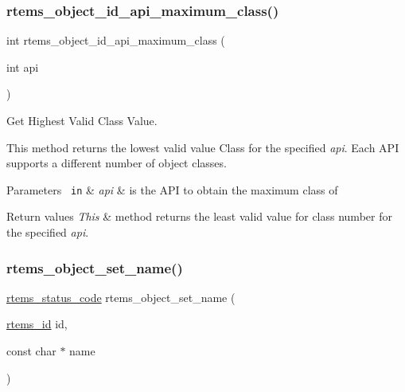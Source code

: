 \subsubsection{\texorpdfstring{rtems\_object\_id\_api\_maximum\_class()}{rtems\_object\_id\_api\_maximum\_class()}}
{\footnotesize\ttfamily int rtems\+\_\+object\+\_\+id\+\_\+api\+\_\+maximum\+\_\+class (\begin{DoxyParamCaption}\item[{int}]{api }\end{DoxyParamCaption})}



Get Highest Valid Class Value. 

This method returns the lowest valid value Class for the specified {\itshape api}. Each A\+PI supports a different number of object classes.


\begin{DoxyParams}[1]{Parameters}
\mbox{\texttt{ in}}  & {\em api} & is the A\+PI to obtain the maximum class of\\
\hline
\end{DoxyParams}

\begin{DoxyRetVals}{Return values}
{\em This} & method returns the least valid value for class number for the specified {\itshape api}. \\
\hline
\end{DoxyRetVals}
\mbox{\label{group__ClassicClassInfo_gacb1a1933caf2556aa7e9b715c684fe5b}} 
\subsubsection{\texorpdfstring{rtems\_object\_set\_name()}{rtems\_object\_set\_name()}}
{\footnotesize\ttfamily \mbox{\hyperlink{group__ClassicStatus_ga545d41846817eaba6143d52ee4d9e9fe}{rtems\+\_\+status\+\_\+code}} rtems\+\_\+object\+\_\+set\+\_\+name (\begin{DoxyParamCaption}\item[{\mbox{\hyperlink{group__ClassicTasks_gab20892b814dced7dd4e5b9bf42becd57}{rtems\+\_\+id}}}]{id,  }\item[{const char $\ast$}]{name }\end{DoxyParamCaption})}



